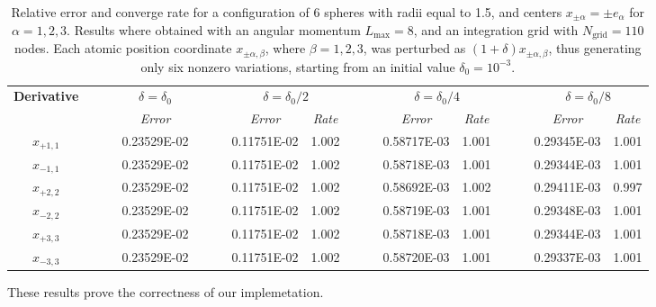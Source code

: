 \documentclass[aip,jcp,a4paper,11pt]{revtex4-1}
\begin{document}
\begin{table}[t]
\footnotesize
\begin{center}
	\begin{tabular}{ @{}cccc  cccc  cccc @{} }
\toprule[0.1em] 
\multirow{2}{*}{\bf Derivative} & $\phantom{abs}$ &  \multicolumn{1}{c}{$\delta = \delta_0$}& $\phantom{abs}$  & \multicolumn{2}{c}{$\delta = \delta_0/2$}& $\phantom{abs}$  & \multicolumn{2}{c}{$\delta = \delta_0/4$}& $\phantom{abs}$  & \multicolumn{2}{c}{$\delta = \delta_0/8$} \\
		         \cmidrule[0.05em]{3-3}  \cmidrule[0.05em](lr){5-6}  \cmidrule[0.05em]{8-9}   \cmidrule[0.05em]{11-12}
&	& {\sl Error}	&& {\sl Error}	& {\sl Rate} && {\sl Error}	& {\sl Rate}&& {\sl Error}	& {\sl Rate} \\
\midrule[0.05em]
$x_{+1,1}$ &  &  0.23529E-02  &  &    0.11751E-02  &  1.002  &&  0.58717E-03  &  1.001  &&  0.29345E-03  &  1.001  \\
$x_ {-1,1}$  &&  0.23529E-02  &   &  0.11751E-02  &  1.002  &&  0.58718E-03  &  1.001  &&  0.29344E-03  &  1.001  \\
$x_ {+2,2}$  &&  0.23529E-02  &   & 0.11751E-02  &  1.002  &&  0.58692E-03  &  1.002  &&  0.29411E-03  &  0.997  \\
$x_ {-2,2}$  &&  0.23529E-02  &    &0.11751E-02  &  1.002  &&  0.58719E-03  &  1.001  &&  0.29348E-03  &  1.001  \\
$x_ {+3,3}$  &&  0.23529E-02  &  &  0.11751E-02  &  1.002  &&  0.58718E-03  &  1.001  &&  0.29344E-03  &  1.001  \\
$x_ {-3,3}$  &&  0.23529E-02  &   &  0.11751E-02  &  1.002  &&  0.58720E-03  &  1.001  &&  0.29337E-03  &  1.001  \\
\bottomrule[0.1em]
\end{tabular}
\caption{Relative error and converge rate for a configuration of 6 spheres with radii equal to 1.5, and centers $x_{\pm \alpha} =  \pm e_\alpha$ for $\alpha = 1, 2,3$.  Results where obtained with an angular momentum $L_\text{max} =  8$, and an integration grid with $N_\text{grid} = 110$ nodes. Each atomic position coordinate $x_{\pm\alpha,\beta}$, where $\beta = 1,2,3$, was perturbed as $(1 + \delta)x_{\pm\alpha , \beta}$, thus generating only six nonzero variations, starting from an initial value $\delta_0 = 10^{-3}$.}\label{tab:1}
\end{center}
\end{table}
These results prove the correctness of our implemetation. 
\end{document}
